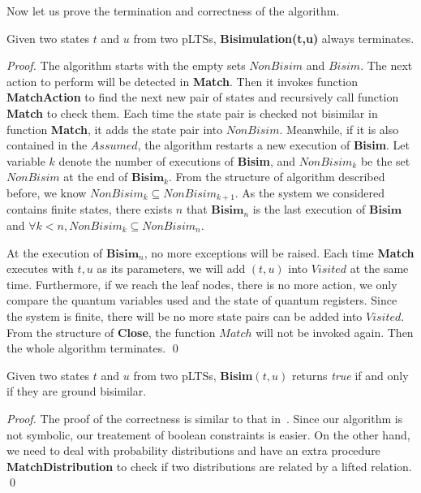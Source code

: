 \documentclass[a4paper,runningheads]{llncs}
\begin{document}
Now let us prove the termination and correctness of the algorithm. 


\begin{theorem}[Termination]\label{thm:strong_alg_termination}
Given two states $t$ and $u$ from two pLTSs, \textbf{Bisimulation(t,u)} always terminates.
\end{theorem} 
\begin{proof}
The algorithm starts with the empty sets $NonBisim$ and $Bisim$. The next action to perform will be detected in \textbf{Match}. Then it invokes function \textbf{MatchAction} to find the next new pair of states and recursively call function \textbf{Match} to check them. Each time the state pair is checked not bisimilar in function \textbf{Match}, it adds the state pair into $NonBisim$. Meanwhile, if it is also contained in the $Assumed$, the algorithm restarts a new execution of \textbf{Bisim}. Let variable $k$ denote the number of executions of \textbf{Bisim}, and $NonBisim_{k}$ be the set $NonBisim$ at the end of $\textbf{Bisim}_{k}$. From the structure of algorithm described before, we know $NonBisim_{k}\subseteq NonBisim_{k+1}$. As the system we considered contains finite states, there exists $n$ that $\textbf{Bisim}_{n}$ is the last execution of $\textbf{Bisim}$ and $\forall k<n, NonBisim_{k}\subseteq NonBisim_{n}$.

At the execution of $\textbf{Bisim}_{n}$, no more exceptions will be raised. Each time \textbf{Match} executes with $t,u$ as its parameters, we will add $(t,u)$ into $Visited$ at the same time. Furthermore, if we reach the leaf nodes, there is no more action, we only compare the quantum variables used and the state of quantum registers. Since the system is finite, there will be no more state pairs can be added into $Visited$. From the structure of \textbf{Close}, the function $Match$ will not be invoked again.  Then the whole algorithm terminates.
\qed
\end{proof}

\begin{theorem}[Correctness]\label{thm:strong_alg_correctness}
Given two states $t$ and $u$ from two pLTSs, \textbf{Bisim}$(t,u)$ returns \textit{true} if and only if they are ground bisimilar.
\end{theorem} 
\begin{proof}
The proof of the correctness is similar to that in~\cite{HL95}. Since our algorithm is not symbolic, our treatement of boolean constraints is easier. On the other hand, we need to deal with probability distributions and have an extra procedure \textbf{MatchDistribution} to check if two distributions are related by a lifted relation.
\qed
\end{proof}
\end{document}
